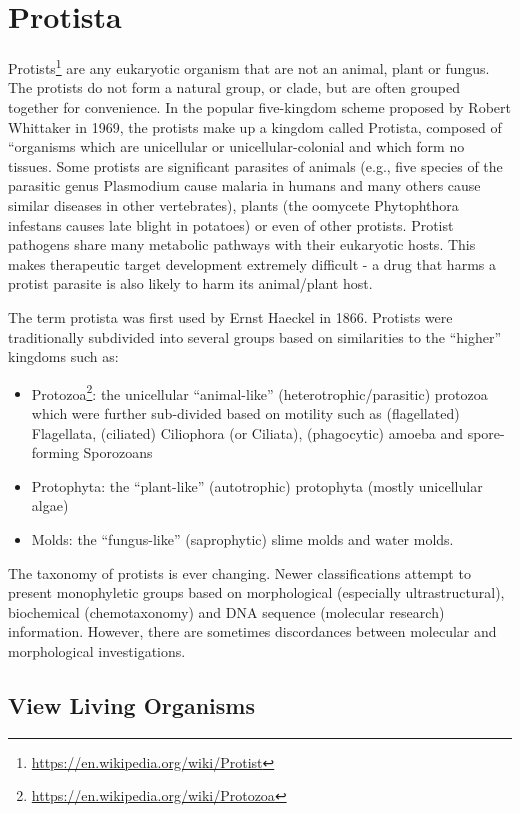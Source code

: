 \documentclass[]{book}
\providecommand{\tightlist}{%
  \setlength{\itemsep}{0pt}\setlength{\parskip}{0pt}}
\let\rmarkdownfootnote\footnote%
\def\footnote{\protect\rmarkdownfootnote}
\renewcommand{\href}[2]{#2\footnote{\url{#1}}}
\theoremstyle{definition}
\theoremstyle{definition}
\theoremstyle{definition}
\theoremstyle{remark}
\begin{document}
\chapter{Protista}\label{protista}

\href{https://en.wikipedia.org/wiki/Protist}{Protists} are any
eukaryotic organism that are not an animal, plant or fungus. The
protists do not form a natural group, or clade, but are often grouped
together for convenience. In the popular five-kingdom scheme proposed by
Robert Whittaker in 1969, the protists make up a kingdom called
Protista, composed of ``organisms which are unicellular or
unicellular-colonial and which form no tissues. Some protists are
significant parasites of animals (e.g., five species of the parasitic
genus Plasmodium cause malaria in humans and many others cause similar
diseases in other vertebrates), plants (the oomycete Phytophthora
infestans causes late blight in potatoes) or even of other protists.
Protist pathogens share many metabolic pathways with their eukaryotic
hosts. This makes therapeutic target development extremely difficult - a
drug that harms a protist parasite is also likely to harm its
animal/plant host.

The term protista was first used by Ernst Haeckel in 1866. Protists were
traditionally subdivided into several groups based on similarities to
the ``higher'' kingdoms such as:

\begin{itemize}
\tightlist
\item
  \href{https://en.wikipedia.org/wiki/Protozoa}{Protozoa}: the
  unicellular ``animal-like'' (heterotrophic/parasitic) protozoa which
  were further sub-divided based on motility such as (flagellated)
  Flagellata, (ciliated) Ciliophora (or Ciliata), (phagocytic) amoeba
  and spore-forming Sporozoans
\item
  Protophyta: the ``plant-like'' (autotrophic) protophyta (mostly
  unicellular algae)
\item
  Molds: the ``fungus-like'' (saprophytic) slime molds and water molds.
\end{itemize}

The taxonomy of protists is ever changing. Newer classifications attempt
to present monophyletic groups based on morphological (especially
ultrastructural), biochemical (chemotaxonomy) and DNA sequence
(molecular research) information. However, there are sometimes
discordances between molecular and morphological investigations.

\section{View Living Organisms}\label{view-living-organisms-1}
\end{document}
